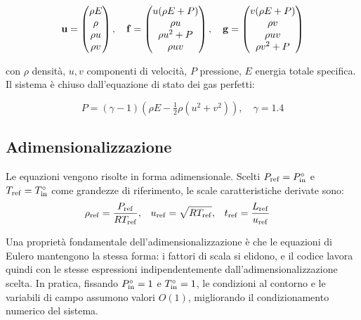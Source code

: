 \begin{equation}
  \mathbf{u} = \begin{pmatrix} \rho E \\ \rho \\ \rho u \\ \rho v \end{pmatrix}, \quad
  \mathbf{f} = \begin{pmatrix} u(\rho E + P) \\ \rho u \\ \rho u^2 + P \\ \rho u v \end{pmatrix}, \quad
  \mathbf{g} = \begin{pmatrix} v(\rho E + P) \\ \rho v \\ \rho u v \\ \rho v^2 + P \end{pmatrix}
\end{equation}

con $\rho$ densità, $u, v$ componenti di velocità, $P$ pressione, $E$ energia totale specifica.
Il sistema è chiuso dall'equazione di stato dei gas perfetti:

\begin{equation}
  P = (\gamma - 1)\left(\rho E - \tfrac{1}{2}\rho(u^2+v^2)\right), \quad \gamma = 1.4
\end{equation}

\subsection{Adimensionalizzazione}

Le equazioni vengono risolte in forma adimensionale. Scelti $P_{\rm ref} = P^\circ_{\rm in}$
e $T_{\rm ref} = T^\circ_{\rm in}$ come grandezze di riferimento, le scale caratteristiche
derivate sono:
\begin{align*}
  \rho_{\rm ref} &= \frac{P_{\rm ref}}{R T_{\rm ref}}, &
  u_{\rm ref} &= \sqrt{R T_{\rm ref}}, &
  t_{\rm ref} &= \frac{L_{\rm ref}}{u_{\rm ref}}
\end{align*}

Una proprietà fondamentale dell'adimensionalizzazione è che le equazioni di Eulero mantengono
la stessa forma: i fattori di scala si elidono, e il codice lavora quindi con le stesse
espressioni indipendentemente dall'adimensionalizzazione scelta. In pratica, fissando
$P^\circ_{\rm in} = 1$ e $T^\circ_{\rm in} = 1$, le condizioni al contorno e le variabili
di campo assumono valori $O(1)$, migliorando il condizionamento numerico del sistema.

